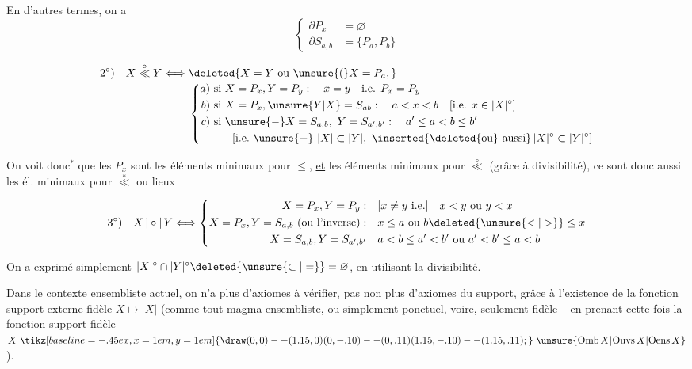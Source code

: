 En d'autres termes, on a
\[
\left\{\begin{aligned}
 \partial P_x&=\varnothing\\
 \partial S_{a,b}&=\{P_a,P_b\}
\end{aligned}\right.
\]

\[
\begin{aligned}
2^\circ)\quad X\overset{\circ}{\ll}Y\Longleftrightarrow{}&
  \deleted{X=Y\ \text{ou}\ \unsure{(}X=P_a,}\\[-2pt]
&\left\{\begin{aligned}
 a)&\ \text{si }X=P_x,Y=P_y:\quad x=y\quad\text{i.e. }P_x=P_y\\
 b)&\ \text{si }X=P_x,\unsure{Y|X}=S_{ab}:\quad a<x<b\quad
       [\text{i.e. }x\in|X|^\circ]\\
 c)&\ \text{si }\unsure{-}X=S_{a,b},\ Y=S_{a',b'}:\quad a'\leq a<b\leq b'\\
   &\qquad[\text{i.e.}\ \unsure{-}\ |X|\subset|Y|,\ \inserted{\text{\deleted{ou} aussi}}\,
                 |X|^\circ\subset|Y|^\circ]
 \end{aligned}\right.
\end{aligned}
\]

On voit donc\({}^{*}\) que les $P_x$ sont les éléments minimaux pour $\leq$, \uline{et} les éléments minimaux pour $\overset{\circ}{\ll}$ (grâce à divisibilité), ce sont donc aussi les él. minimaux pour $\overset{*}{\ll}$ ou lieux

\[
3^\circ)\quad X\,|\circ|\,Y\Longleftrightarrow
 \left\{\begin{aligned}
 X=P_x,Y=P_y:\quad &[x\ne y\ \text{i.e.}]\quad x<y\ \text{ou}\ y<x\\
 X=P_x,Y=S_{a,b}\ (\text{ou l'inverse}):\quad &x\leq a\ \text{ou}\ b\deleted{\unsure{<|>}}\leq x\\
 X=S_{a,b},Y=S_{a',b'}\quad &a<b\leq a'<b'\ \text{ou}\ a'<b'\leq a<b
 \end{aligned}\right.
\]

On a exprimé simplement $|X|^\circ\cap|Y|^\circ\deleted{\unsure{\subset|=}}=\varnothing$, en utilisant la divisibilité.

Dans le contexte ensembliste actuel, on n'a plus d'axiomes à vérifier, pas non plus d'axiomes du support, grâce à l'existence de la fonction support externe fidèle $X\mapsto|X|$ (comme   tout magma ensembliste, ou simplement ponctuel, voire, seulement fidèle -- en prenant cette fois la fonction support fidèle $X\mathrel{\tikz[baseline=-.45ex,x=1em,y=1em]{\draw (0,0)--(1.15,0) (0,-.10)--(0,.11) (1.15,-.10)--(1.15,.11);}}\unsure{\mathrm{Omb}\,X|\mathrm{Ouvs}\,X|\mathrm{Oens}\,X}$).

